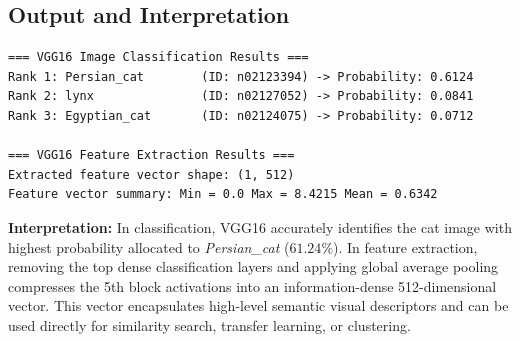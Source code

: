 \documentclass[12pt,a4paper]{article}
\begin{document}
\subsection{Output and Interpretation}
\begin{verbatim}
=== VGG16 Image Classification Results ===
Rank 1: Persian_cat        (ID: n02123394) -> Probability: 0.6124
Rank 2: lynx               (ID: n02127052) -> Probability: 0.0841
Rank 3: Egyptian_cat       (ID: n02124075) -> Probability: 0.0712

=== VGG16 Feature Extraction Results ===
Extracted feature vector shape: (1, 512)
Feature vector summary: Min = 0.0 Max = 8.4215 Mean = 0.6342
\end{verbatim}

\textbf{Interpretation:}
In classification, VGG16 accurately identifies the cat image with highest probability allocated to \textit{Persian\_cat} ($61.24\%$). In feature extraction, removing the top dense classification layers and applying global average pooling compresses the 5th block activations into an information-dense 512-dimensional vector. This vector encapsulates high-level semantic visual descriptors and can be used directly for similarity search, transfer learning, or clustering.
\end{document}
